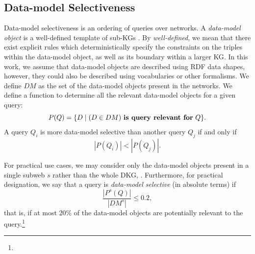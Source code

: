 \subsection{Data-model Selectiveness}
Data-model selectiveness is an ordering of queries over networks.
A \emph{data-model object} is a well-defined template of sub-\acp{KG} .
By \emph{well-defined}, we mean that there exist explicit rules which deterministically specify the constraints on the triples within the data-model object, as well as its boundary within a larger \ac{KG}.
In this work, we assume that data-model objects are described using \ac{RDF} data shapes, however, they could also be described using vocabularies or other formalisms.
We define $DM$ as the set of the data-model objects present in the networks.
We define a function to determine all the relevant data-model objects for a given query:
\begin{equation}
	P(Q) = \{ D \mid (D \in DM) \text{ \textbf{is query relevant for} } Q \}.
\end{equation}
A query $Q_i$ is more data-model selective than another query $Q_j$ if and only if
\begin{equation}
	\left| P(Q_i) \right| < \left| P(Q_j) \right|.
\end{equation}

For practical use cases, we may consider only the data-model objects present in a single subweb $s$ rather than the whole \ac{DKG}, .
Furthermore, for practical designation, we say that a query is \emph{data-model selective} (in absolute terms) if
\begin{equation}
	\frac{\left| P^s(Q) \right|}{\left| DM^s \right|} \leq 0.2,
\end{equation}
that is, if at most 20\% of the data-model objects are potentially relevant to the query.\footnote{}
